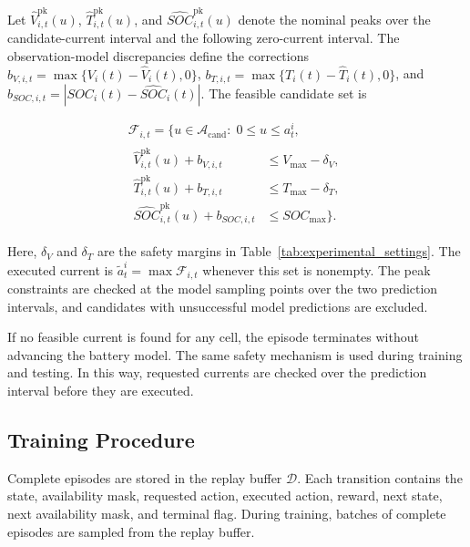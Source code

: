 \documentclass[10pt,journal,letterpaper]{IEEEtran}
\newcommand{\newrev}[1]{#1}
\begin{document}
\newrev{Let $\widehat{V}_{i,t}^{\mathrm{pk}}(u)$, $\widehat{T}_{i,t}^{\mathrm{pk}}(u)$, and $\widehat{SOC}_{i,t}^{\mathrm{pk}}(u)$ denote the nominal peaks over the candidate-current interval and the following zero-current interval. The observation-model discrepancies define the corrections $b_{V,i,t}=\max\{V_i(t)-\widehat{V}_i(t),0\}$, $b_{T,i,t}=\max\{T_i(t)-\widehat{T}_i(t),0\}$, and $b_{SOC,i,t}=|SOC_i(t)-\widehat{SOC}_i(t)|$. The feasible candidate set is}

\begin{equation}
\label{eq:safety_candidates}
\newrev{\begin{gathered}
\mathcal{F}_{i,t}=\bigl\{u\in\mathcal{A}_{\mathrm{cand}}:\;0\leq u\leq a_t^i,\\[-1pt]
\begin{aligned}
\widehat{V}_{i,t}^{\mathrm{pk}}(u)+b_{V,i,t}&\leq V_{\max}-\delta_V,\\[-1pt]
\widehat{T}_{i,t}^{\mathrm{pk}}(u)+b_{T,i,t}&\leq T_{\max}-\delta_T,\\[-1pt]
\widehat{SOC}_{i,t}^{\mathrm{pk}}(u)+b_{SOC,i,t}&\leq SOC_{\max}\bigr\}.
\end{aligned}
\end{gathered}}
\end{equation}

\newrev{Here, $\delta_V$ and $\delta_T$ are the safety margins in Table~\ref{tab:experimental_settings}. The executed current is $\tilde{a}_t^i=\max\mathcal{F}_{i,t}$ whenever this set is nonempty. The peak constraints are checked at the model sampling points over the two prediction intervals, and candidates with unsuccessful model predictions are excluded.}

If no feasible current is found for any cell, the episode terminates without advancing the battery model. The same safety mechanism is used during training and testing. In this way, requested currents are checked over the prediction interval before they are executed.

\subsection{Training Procedure}

Complete episodes are stored in the replay buffer $\mathcal{D}$. Each transition contains the state, availability mask, requested action, executed action, reward, next state, next availability mask, and terminal flag. During training, batches of complete episodes are sampled from the replay buffer.
\end{document}
